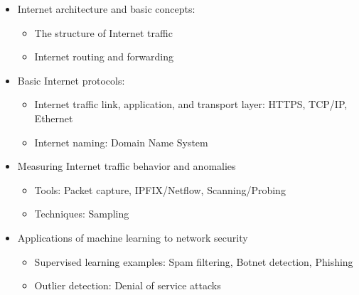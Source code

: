 \documentclass[12pt]{article}
\renewcommand{\_}{\kern-1.5pt\textunderscore\kern-1.5pt}
\begin{document}
\begin{itemize}
	\item Internet architecture and basic concepts:\par

\begin{itemize}
	\item The structure of Internet traffic\par

	\item Internet routing and forwarding\par

\end{itemize}
	\item Basic Internet protocols:\par

\begin{itemize}
	\item Internet traffic link, application, and transport layer: HTTPS, TCP/IP, Ethernet\par

	\item Internet naming: Domain Name System\par

\end{itemize}
	\item Measuring Internet traffic behavior and anomalies\par

\begin{itemize}
	\item Tools: Packet capture, IPFIX/Netflow, Scanning/Probing\par

	\item Techniques: Sampling\par


\end{itemize}
	\item Applications of machine learning to network security\par

\begin{itemize}
	\item Supervised learning examples: Spam filtering, Botnet detection, Phishing\par

	\item Outlier detection: Denial of service attacks
\end{itemize}
\end{itemize}\par
\end{document}
